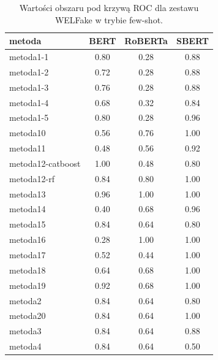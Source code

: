 \begin{table}[H]
	\centering
	\caption{Wartości obszaru pod krzywą ROC dla zestawu WELFake w trybie few-shot.}
	\label{tab:roc_auc_few_shot_welfake}
	\small
	\begin{tabular}{lccc}
		\toprule
		\textbf{metoda}   & \textbf{BERT} & \textbf{RoBERTa} & \textbf{SBERT} \\
		\midrule
		metoda1-1         & 0.80          & 0.28             & 0.88           \\
		metoda1-2         & 0.72          & 0.28             & 0.88           \\
		metoda1-3         & 0.76          & 0.28             & 0.88           \\
		metoda1-4         & 0.68          & 0.32             & 0.84           \\
		metoda1-5         & 0.80          & 0.28             & 0.96           \\
		metoda10          & 0.56          & 0.76             & 1.00           \\
		metoda11          & 0.48          & 0.56             & 0.92           \\
		metoda12-catboost & 1.00          & 0.48             & 0.80           \\
		metoda12-rf       & 0.84          & 0.80             & 1.00           \\
		metoda13          & 0.96          & 1.00             & 1.00           \\
		metoda14          & 0.40          & 0.68             & 0.96           \\
		metoda15          & 0.84          & 0.64             & 0.80           \\
		metoda16          & 0.28          & 1.00             & 1.00           \\
		metoda17          & 0.52          & 0.44             & 1.00           \\
		metoda18          & 0.64          & 0.68             & 1.00           \\
		metoda19          & 0.92          & 0.68             & 1.00           \\
		metoda2           & 0.84          & 0.64             & 0.80           \\
		metoda20          & 0.84          & 0.64             & 1.00           \\
		metoda3           & 0.84          & 0.64             & 0.88           \\
		metoda4           & 0.84          & 0.64             & 0.50           \\

\end{tabular}
\end{table}
